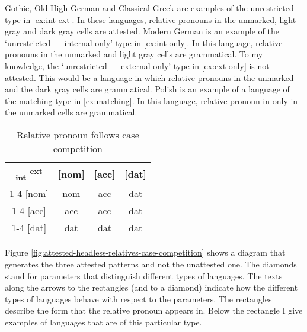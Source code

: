 Gothic, Old High German and Classical Greek are examples of the unrestricted type in \ref{ex:int-ext}. In these languages, relative pronouns in the unmarked, light gray and dark gray cells are attested.
Modern German is an example of the `unrestricted --- internal-only' type in \ref{ex:int-only}. In this language, relative pronouns in the unmarked and light gray cells are grammatical.
To my knowledge, the `unrestricted --- external-only' type in \ref{ex:ext-only} is not attested. This would be a language in which relative pronouns in the unmarked and the dark gray cells are grammatical.
Polish is an example of a language of the matching type in \ref{ex:matching}. In this language, relative pronoun in only in the unmarked cells are grammatical.

\begin{table}[ht]
  \center
  \caption{Relative pronoun follows case competition}
  \begin{tabular}{c|c|c|c}
    \toprule
    \textsubscript{\ac{int}} \textsuperscript{\ac{ext}}
           & [\ac{nom}]
           & [\ac{acc}]
           & [\ac{dat}]
           \\ \cmidrule{1-4}
       [\ac{nom}]
           & \ac{nom}
           & \cellcolor{DG}\ac{acc}
           & \cellcolor{DG}\ac{dat}
           \\ \cmidrule{1-4}
       [\ac{acc}]
           & \cellcolor{LG}\ac{acc}
           & \ac{acc}
           & \cellcolor{DG}\ac{dat}
           \\ \cmidrule{1-4}
       [\ac{dat}]
           & \cellcolor{LG}\ac{dat}
           & \cellcolor{LG}\ac{dat}
           & \ac{dat}
           \\
     \bottomrule
  \end{tabular}
    \label{tbl:case-competition-table-marking}
\end{table}

Figure \ref{fig:attested-headless-relatives-case-competition} shows a diagram that generates the three attested patterns and not the unattested one. The diamonds stand for parameters that distinguish different types of languages. The texts along the arrows to the rectangles (and to a diamond) indicate how the different types of languages behave with respect to the parameters. The rectangles describe the form that the relative pronoun appears in. Below the rectangle I give examples of languages that are of this particular type.

